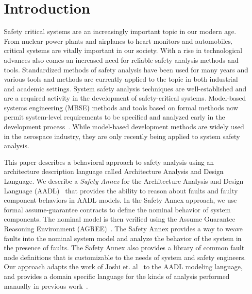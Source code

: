 \section{Introduction}
\label{sec:intro}
Safety critical systems are an increasingly important topic in our modern age. From nuclear power plants and airplanes to heart monitors and automobiles, critical systems are vitally important in our society. With a rise in technological advances also comes an increased need for reliable safety analysis methods and tools. Standardized methods of safety analysis have been used for many years and various tools and methods are currently applied to the topic in both industrial and academic settings. System safety analysis techniques are well-established and are a required activity in the development of safety-critical systems. Model-based systems engineering (MBSE) methods and tools based on formal methods now permit system-level requirements to be specified and analyzed early in the development process~\cite{NFM2012:CoGaMiWhLaLu,CAV2015:BoCiGrMa}. While model-based development methods are widely used in the aerospace industry, they are only recently being applied to system safety analysis.  

This paper describes a behavioral approach to safety analysis using an architecture description language called Architecture Analysis and Design Language. We describe a {\em Safety Annex} for the Architecture Analysis and Design Language (AADL)~\cite{FeilerModelBasedEngineering2012} that provides the ability to reason about faults and faulty component behaviors in AADL models. In the Safety Annex approach, we use formal assume-guarantee contracts to define the nominal behavior of system components. The nominal model is then verified using the Assume Guarantee Reasoning Environment (AGREE)~\cite{NFM2012:CoGaMiWhLaLu}. The Safety Annex  provides a way to weave faults into the nominal system model and analyze the behavior of the system in the presence of faults. The Safety Annex also provides a library of common fault node definitions that is customizable to the needs of system and safety engineers. Our approach adapts the work of Joshi et. al~\cite{Joshi05:Dasc} to the AADL modeling language, and provides a domain specific language for the kinds of analysis performed manually in previous work~\cite{Stewart17:IMBSA}. 



